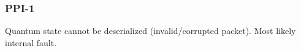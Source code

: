 \subsubsection{PPI-1}\label{sec:error_code_ppi_1}

Quantum state cannot be deserialized (invalid/corrupted packet). Most likely internal fault.

